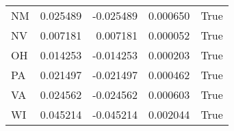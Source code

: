 \begin{table}
\begin{tabular}{lrrrl}
      NM &   0.025489 & -0.025489 &       0.000650 &          True \\
      NV &   0.007181 &  0.007181 &       0.000052 &          True \\
      OH &   0.014253 & -0.014253 &       0.000203 &          True \\
      PA &   0.021497 & -0.021497 &       0.000462 &          True \\
      VA &   0.024562 & -0.024562 &       0.000603 &          True \\
      WI &   0.045214 & -0.045214 &       0.002044 &          True \\
\bottomrule
\end{tabular}
\end{table}
